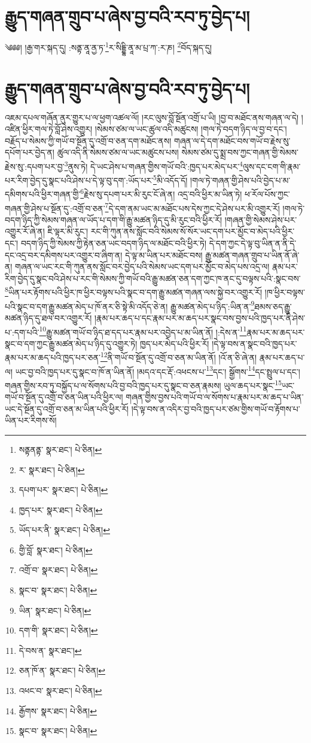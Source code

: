 \setcounter{footnote}{0} 
\chapter{རྒྱུད་གཞན་གྲུབ་པ་ཞེས་བྱ་བའི་རབ་ཏུ་བྱེད་པ།}༄༅༅། །རྒྱ་གར་སྐད་དུ། :སནྟ་ནཱ་ནྱ་ཏ་\footnote{སནྟནནྟ་  སྣར་ཐང་།  པེ་ཅིན། }ར་སིདྡྷི་ནཱ་མ་པྲ་ཀ་:ར་ཎ། \footnote{ར་  སྣར་ཐང་།  པེ་ཅིན། }བོད་སྐད་དུ། \chapter{རྒྱུད་གཞན་གྲུབ་པ་ཞེས་བྱ་བའི་རབ་ཏུ་བྱེད་པ།} འཇམ་དཔལ་གཞོན་ནུར་གྱུར་པ་ལ་ཕྱག་འཚལ་ལོ། །རང་ལུས་བློ་སྔོན་འགྲོ་པ་ཡི། །བྱ་བ་མཐོང་ནས་གཞན་ལ་དེ། །འཛིན་ཕྱིར་གལ་ཏེ་བློ་ཤེས་འགྱུར། །སེམས་ཙམ་ལ་ཡང་ཚུལ་འདི་མཚུངས། །གལ་ཏེ་བདག་ཉིད་ལ་བྱ་བ་དང་། བརྗོད་པ་སེམས་ཀྱི་གཡོ་བ་སྔོན་དུ་འགྲོ་བ་ཅན་དག་མཐོང་ནས། གཞན་ལ་དེ་དག་མཐོང་བས་གཡོ་བ་རྗེས་སུ་དཔོག་པར་བྱེད་ན། ཚུལ་འདི་ནི་སེམས་ཙམ་ལ་ཡང་མཚུངས་པས། སེམས་ཙམ་དུ་སྨྲ་བས་ཀྱང་གཞན་གྱི་སེམས་རྗེས་སུ་:དཔག་པར་བྱ་\footnote{དཔག་པར་  སྣར་ཐང་།  པེ་ཅིན། }ནུས་ཏེ། དེ་ཡང་ཤེས་པ་གཞན་གྱིས་གཡོ་བའི་:ཁྱད་པར་མེད་པར་\footnote{ཁྱད་པར་  སྣར་ཐང་།  པེ་ཅིན། }ལུས་དང་ངག་གི་རྣམ་པར་རིག་བྱེད་དུ་སྣང་པའི་ཤེས་པ་དེ་ལྟ་བུ་དག་:ཡོད་པར་\footnote{ཡོད་པར་ནི་  སྣར་ཐང་།  པེ་ཅིན། }མི་འདོད་དོ། །གལ་ཏེ་གཞན་གྱི་ཤེས་པའི་བྱེད་པ་མ་དམིགས་པའི་ཕྱིར་གཞན་གྱི་\footnote{གྱི་བློ་  སྣར་ཐང་།  པེ་ཅིན། }རྗེས་སུ་དཔག་པར་མི་རུང་ངོ་ཞེ་ན། འདྲ་བའི་ཕྱིར་མ་ཡིན་ཏེ། ཕ་རོལ་པོས་ཀྱང་གཞན་གྱི་ཤེས་པ་སྔོན་དུ་:འགྲོ་བ་ཅན་\footnote{འགྲོ་བ་  སྣར་ཐང་།  པེ་ཅིན། }དེ་དག་ནམ་ཡང་མ་མཐོང་པས་དེས་ཀྱང་དེ་ཤེས་པར་མི་འགྱུར་རོ། །གལ་ཏེ་བདག་ཉིད་ཀྱི་སེམས་གཞན་ལ་ཡོད་པ་དག་གི་རྒྱུ་མཚན་ཉིད་དུ་མི་རུང་བའི་ཕྱིར་རོ། །གཞན་གྱི་སེམས་ཤེས་པར་འགྱུར་རོ་ཞེ་ན། ཇི་ལྟར་མི་རུང་། རང་གི་ཀུན་ནས་སློང་བའི་སེམས་སོ་སོར་ཡང་དག་པར་མྱོང་བ་མེད་པའི་ཕྱིར་དང་། བདག་ཉིད་ཀྱི་སེམས་ཀྱི་རྟེན་ཅན་ཡང་བདག་ཉིད་ལ་མཐོང་བའི་ཕྱིར་ཏེ། དེ་དག་ཀྱང་དེ་ལྟ་བུ་ཡིན་ན་ནི་དེ་དང་འདྲ་བར་དམིགས་པར་འགྱུར་བ་ཞིག་ན། དེ་ལྟ་མ་ཡིན་པར་མཐོང་བས། རྒྱུ་མཚན་གཞན་གྲུབ་པ་ཡིན་ནོ་ཞེ་ན། གཞན་ལ་ཡང་རང་གི་ཀུན་ནས་སློང་བར་བྱེད་པའི་སེམས་ཡང་དག་པར་མྱོང་བ་མེད་པས་འདྲ་ལ། རྣམ་པར་རིག་བྱེད་དུ་སྣང་བའི་ཤེས་པ་རང་གི་སེམས་ཀྱི་གཡོ་བའི་རྒྱུ་མཚན་ཅན་དག་ཀྱང་ཁ་ནང་དུ་བལྟས་པའི་:སྣང་བས་\footnote{སྣང་བ་  སྣར་ཐང་།  པེ་ཅིན། }ཡིན་པར་རྟོགས་པའི་ཕྱིར་ཁ་ཕྱིར་བལྟས་པའི་སྣང་བ་དག་རྒྱུ་མཚན་གཞན་ལས་སྐྱེ་བར་འགྱུར་རོ། །ཁ་ཕྱིར་བལྟས་པའི་སྣང་བ་དག་རྒྱུ་མཚན་མེད་པ་ཁོ་ནར་ཅི་སྟེ་མི་འདོད་ཅེ་ན། རྒྱུ་མཚན་མེད་པ་ཉིད་:ཡིན་ན་\footnote{ཡིན་  སྣར་ཐང་།  པེ་ཅིན། }ཐམས་ཅད་རྒྱུ་མཚན་ཉིད་དུ་ཐལ་བར་འགྱུར་རོ། །རྣམ་པར་ཆད་པ་དང་རྣམ་པར་མ་ཆད་པར་སྣང་བས་བྱས་པའི་ཁྱད་པར་ནི་ཤེས་པ་:དག་པའི་\footnote{དག་གི་  སྣར་ཐང་།  པེ་ཅིན། }རྒྱུ་མཚན་གཡོ་བ་ཉིད་ཐ་དད་པར་རྣམ་པར་འབྱེད་པ་མ་ཡིན་ནོ། །:དེས་ན་\footnote{དེ་བས་ན་  སྣར་ཐང་། }རྣམ་པར་མ་ཆད་པར་སྣང་བ་དག་ཀྱང་རྒྱུ་མཚན་མེད་པ་ཉིད་དུ་འགྱུར་ཏེ། ཁྱད་པར་མེད་པའི་ཕྱིར་རོ། །དེ་ལྟ་བས་ན་སྣང་བའི་ཁྱད་པར་རྣམ་པར་མ་ཆད་པའི་ཁྱད་པར་ཅན་\footnote{ཅན་ཁོ་ན་  སྣར་ཐང་།  པེ་ཅིན། }ནི་གཡོ་བ་སྔོན་དུ་འགྲོ་བ་ཅན་མ་ཡིན་ནོ། །འོ་ན་ཅི་ཞེ་ན། རྣམ་པར་ཆད་པ་ལ། ཡང་བྱ་བའི་ཁྱད་པར་དུ་སྣང་བ་ཁོ་ན་ཡིན་ནོ། །མདའ་དང་རྡོ་:འཕངས་པ་\footnote{འཕང་བ་  སྣར་ཐང་།  པེ་ཅིན། }དང་། སྒྱོགས་\footnote{རྒྱོགས་  སྣར་ཐང་།  པེ་ཅིན། }དང་སྤྲུལ་པ་དང་། གཞན་གྱིས་རབ་ཏུ་བསྐྱོད་པ་ལ་སོགས་པའི་བྱ་བའི་ཁྱད་པར་དུ་སྣང་བ་ཅན་རྣམས། ཡུལ་ཆད་པར་སྣང་\footnote{སྣང་བ་  སྣར་ཐང་།  པེ་ཅིན། }ཡང་གཡོ་བ་སྔོན་དུ་འགྲོ་བ་ཅན་ཡིན་པའི་ཕྱིར་ལ། གཞན་གྱིས་བྱས་པའི་གཡོ་བ་ལ་སོགས་པ་རྣམ་པར་མ་ཆད་པ་ཡིན་ཡང་དེ་སྔོན་དུ་འགྲོ་བ་ཅན་མ་ཡིན་པའི་ཕྱིར་རོ། །དེ་ལྟ་བས་ན་འདིར་བྱ་བའི་ཁྱད་པར་ཙམ་གྱིས་གཡོ་བ་རྟོགས་པ་ཡིན་པར་རིགས་སོ། 